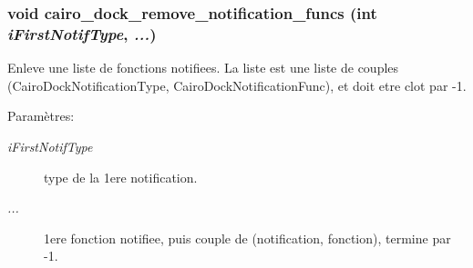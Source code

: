 \subsubsection{\setlength{\rightskip}{0pt plus 5cm}void cairo\_\-dock\_\-remove\_\-notification\_\-funcs (int {\em iFirstNotifType},  {\em ...})}\label{cairo-dock-notifications_8h_4ef98c22645a91ab4ddba1a1df695d3e}


Enleve une liste de fonctions notifiees. La liste est une liste de couples (CairoDockNotificationType, CairoDockNotificationFunc), et doit etre clot par -1. \begin{Desc}
\item[Paramètres:]
\begin{description}
\item[{\em iFirstNotifType}]type de la 1ere notification. \item[{\em ...}]1ere fonction notifiee, puis couple de (notification, fonction), termine par -1. \end{description}
\end{Desc}
